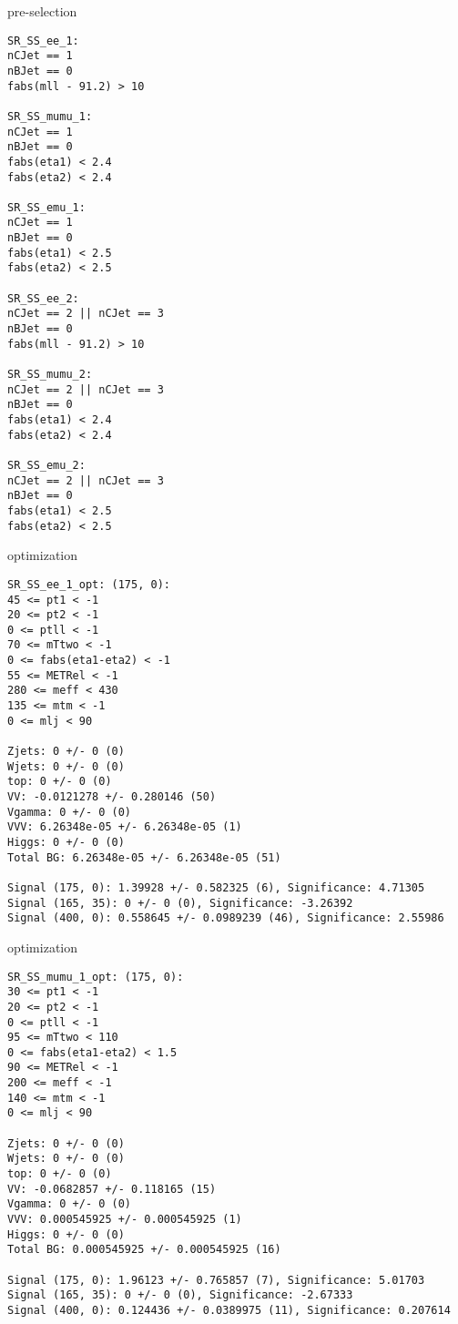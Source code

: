 \begin{frame}[fragile]{pre-selection}
\tiny
\begin{verbatim}
SR_SS_ee_1:
nCJet == 1
nBJet == 0
fabs(mll - 91.2) > 10

SR_SS_mumu_1:
nCJet == 1
nBJet == 0
fabs(eta1) < 2.4
fabs(eta2) < 2.4

SR_SS_emu_1:
nCJet == 1
nBJet == 0
fabs(eta1) < 2.5
fabs(eta2) < 2.5

SR_SS_ee_2:
nCJet == 2 || nCJet == 3
nBJet == 0
fabs(mll - 91.2) > 10

SR_SS_mumu_2:
nCJet == 2 || nCJet == 3
nBJet == 0
fabs(eta1) < 2.4
fabs(eta2) < 2.4

SR_SS_emu_2:
nCJet == 2 || nCJet == 3
nBJet == 0
fabs(eta1) < 2.5
fabs(eta2) < 2.5
\end{verbatim}
\end{frame}

\begin{frame}[fragile]{optimization}
\tiny
\begin{verbatim}
SR_SS_ee_1_opt: (175, 0):
45 <= pt1 < -1
20 <= pt2 < -1
0 <= ptll < -1
70 <= mTtwo < -1
0 <= fabs(eta1-eta2) < -1
55 <= METRel < -1
280 <= meff < 430
135 <= mtm < -1
0 <= mlj < 90

Zjets: 0 +/- 0 (0)
Wjets: 0 +/- 0 (0)
top: 0 +/- 0 (0)
VV: -0.0121278 +/- 0.280146 (50)
Vgamma: 0 +/- 0 (0)
VVV: 6.26348e-05 +/- 6.26348e-05 (1)
Higgs: 0 +/- 0 (0)
Total BG: 6.26348e-05 +/- 6.26348e-05 (51)

Signal (175, 0): 1.39928 +/- 0.582325 (6), Significance: 4.71305
Signal (165, 35): 0 +/- 0 (0), Significance: -3.26392
Signal (400, 0): 0.558645 +/- 0.0989239 (46), Significance: 2.55986
\end{verbatim}
\end{frame}

\begin{frame}[fragile]{optimization}
\tiny
\begin{verbatim}
SR_SS_mumu_1_opt: (175, 0):
30 <= pt1 < -1
20 <= pt2 < -1
0 <= ptll < -1
95 <= mTtwo < 110
0 <= fabs(eta1-eta2) < 1.5
90 <= METRel < -1
200 <= meff < -1
140 <= mtm < -1
0 <= mlj < 90

Zjets: 0 +/- 0 (0)
Wjets: 0 +/- 0 (0)
top: 0 +/- 0 (0)
VV: -0.0682857 +/- 0.118165 (15)
Vgamma: 0 +/- 0 (0)
VVV: 0.000545925 +/- 0.000545925 (1)
Higgs: 0 +/- 0 (0)
Total BG: 0.000545925 +/- 0.000545925 (16)

Signal (175, 0): 1.96123 +/- 0.765857 (7), Significance: 5.01703
Signal (165, 35): 0 +/- 0 (0), Significance: -2.67333
Signal (400, 0): 0.124436 +/- 0.0389975 (11), Significance: 0.207614
\end{verbatim}
\end{frame}

